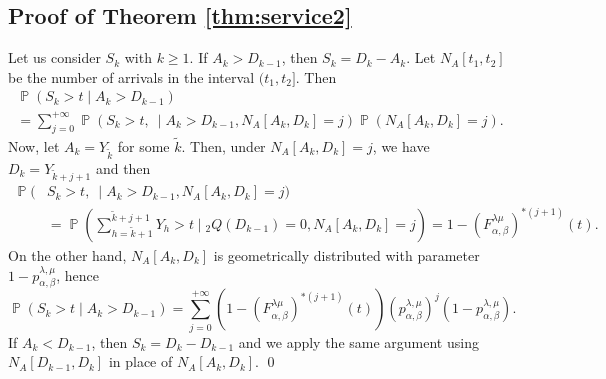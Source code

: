 \documentclass[]{amsart}
\numberwithin{equation}{section}
\theoremstyle{remark}
\theoremstyle{definition}
\DeclareMathOperator{\bP}{\mathbb{P}}
\begin{document}
\subsection{Proof of Theorem \ref{thm:service2}}\label{sec:ptser12}
	Let us consider $S_k$ with $k \ge 1$. If $A_{k}>D_{k-1}$, then $S_k=D_k-A_k$. Let $N_{A}[t_1,t_2]$ be the number of arrivals in the interval $(t_1,t_2]$. Then
	\begin{multline*}
		\bP(S_k>t \mid A_k>D_{k-1})\\
		=\sum_{j=0}^{+\infty}\bP(S_k>t, \ \mid A_k>D_{k-1}, N_A[A_{k},D_k]=j)\bP(N_A[A_{k},D_k]=j).
	\end{multline*}
	Now, let $A_k=Y_{\widetilde{k}}$ for some $\widetilde{k}$. Then, under $N_A[A_{k},D_k]=j$, we have $D_k=Y_{\widetilde{k}+j+1}$ and then
	\begin{align*}
		\bP(&S_k>t, \ \mid A_k>D_{k-1}, N_A[A_{k},D_k]=j)\\
		&=\bP\left(\sum_{h=\widetilde{k}+1}^{\widetilde{k}+j+1}Y_h>t \mid {}_2Q(D_{k-1})=0, N_A[A_{k},D_k]=j\right)=1-(F_{\alpha,\beta}^{\lambda \mu})^{\ast (j+1)}(t).
	\end{align*}
	On the other hand, $N_A[A_{k},D_k]$ is geometrically distributed with parameter $1-p_{\alpha,\beta}^{\lambda,\mu}$, hence
	\begin{equation*}
		\bP(S_k>t \mid A_k>D_{k-1})
		=\sum_{j=0}^{+\infty}(1-(F_{\alpha,\beta}^{\lambda \mu})^{\ast (j+1)}(t))(p_{\alpha,\beta}^{\lambda,\mu})^j(1-p_{\alpha,\beta}^{\lambda,\mu}).
	\end{equation*}
	If $A_k<D_{k-1}$, then $S_k=D_k-D_{k-1}$ and we apply the same argument using $N_A[D_{k-1},D_k]$ in place of $N_A[A_{k},D_k]$.
\hfill \qed
\end{document}
